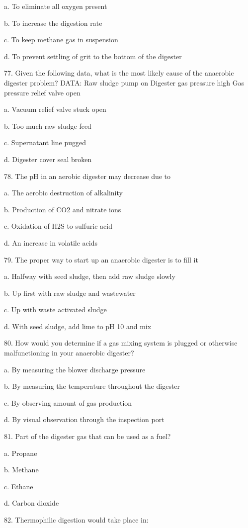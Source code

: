 \documentclass{article}
\begin{document}
a. To eliminate all oxygen present 

b. To increase the digestion rate 

c. To keep methane gas in suspension 

d. To prevent settling of grit to the bottom of the digester 


77. Given the following data, what is the most likely cause of the anaerobic digester problem?
DATA: Raw sludge pump on
Digester gas pressure high
Gas pressure relief valve open 

a. Vacuum relief valve stuck open 

b. Too much raw sludge feed 

c. Supernatant line pugged 

d. Digester cover seal broken 


78. The pH in an aerobic digester may decrease due to 

a. The aerobic destruction of alkalinity 

b. Production of CO2 and nitrate ions 

c. Oxidation of H2S to sulfuric acid 

d. An increase in volatile acids 


79. The proper way to start up an anaerobic digester is to fill it 

a. Halfway with seed sludge, then add raw sludge slowly 

b. Up first with raw sludge and wastewater 

c. Up with waste activated sludge 

d. With seed sludge, add lime to pH 10 and mix 


80. How would you determine if a gas mixing system is plugged or otherwise malfunctioning in your anaerobic digester? 

a. By measuring the blower discharge pressure 

b. By measuring the temperature throughout the digester 

c. By observing amount of gas production 

d. By visual observation through the inspection port 


81. Part of the digester gas that can be used as a fuel? 

a. Propane 

b. Methane 

c. Ethane 

d. Carbon dioxide 


82. Thermophilic digestion would take place in: 
\end{document}
